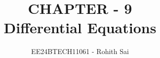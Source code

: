 \documentclass[journal]{IEEEtran}
\begin{document}

\vspace{3cm}

\title{CHAPTER - 9\\Differential Equations}
\author{EE24BTECH11061 - Rohith Sai}
{\let\newpage\relax\maketitle}

\renewcommand{\thefigure}{\theenumi}
\renewcommand{\thetable}{\theenumi}
\setlength{\intextsep}{10pt} %

\renewcommand{\thetable}{\theenumi}
\end{document}
